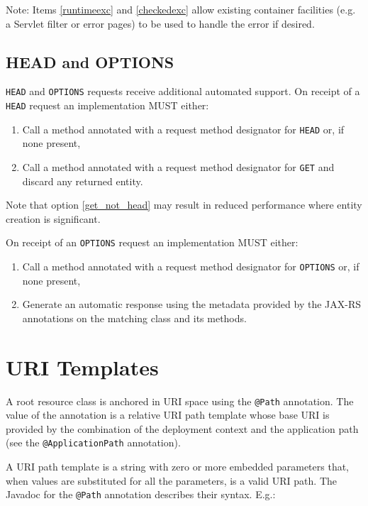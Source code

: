 Note: Items \ref{runtimeexc} and \ref{checkedexc} allow existing container facilities (e.g. a Servlet filter or error
pages) to be used to handle the error if desired.

\subsection{HEAD and OPTIONS}
\label{head_and_options}

\lstinline{HEAD} and \lstinline{OPTIONS} requests receive additional automated support. On receipt of a \lstinline{HEAD}
request an implementation MUST either:

\begin{enumerate}
    \item Call a method annotated with a request method designator for \lstinline{HEAD} or, if none present,
    \item\label{get_not_head} Call a method annotated with a request method designator for \lstinline{GET} and discard
    any returned entity.
\end{enumerate}

\textcolor{highlight green}{Note that option \ref{get_not_head} may result in reduced performance where entity creation is significant.}

On receipt of an \lstinline{OPTIONS} request an implementation MUST either:

\begin{enumerate}
    \item Call a method annotated with a request method designator for \lstinline{OPTIONS} or, if none present,
    \item Generate an automatic response using the metadata provided by the JAX-RS annotations on the matching class and
    its methods.
\end{enumerate}

\section{URI Templates}
\label{uritemplates}

\textcolor{highlight green}{A root resource class is anchored in URI space using the \lstinline{@Path} annotation. The
value of the annotation is a relative URI path template whose base URI is provided by the combination of the deployment
context and the application path (see the \lstinline{@ApplicationPath} annotation)}.

A URI path template is a string with zero or more embedded parameters that, when values are substituted for all the
parameters, is a valid URI path. The Javadoc for the \lstinline{@Path} annotation describes their syntax. E.g.:

